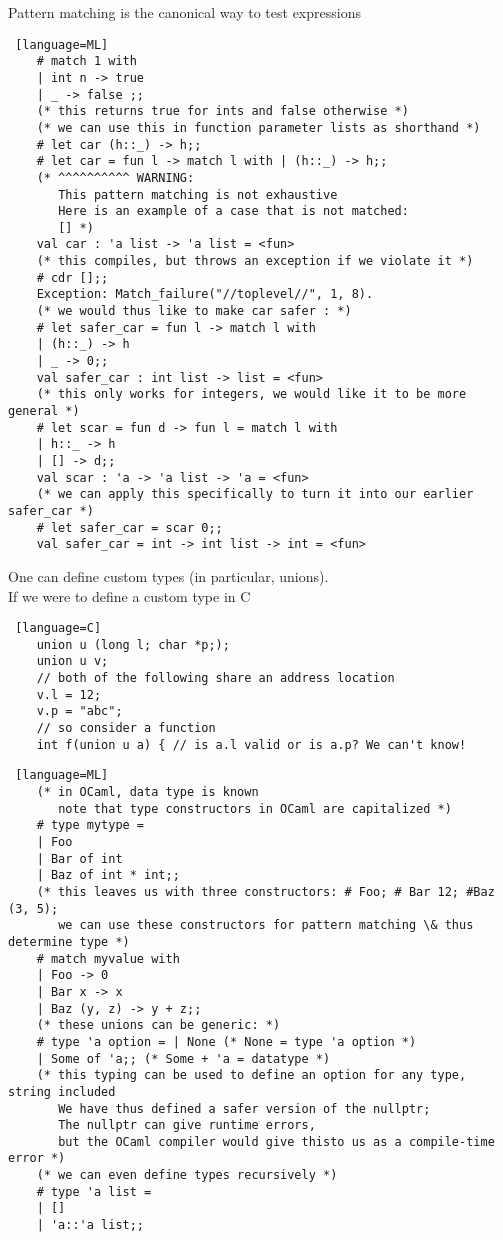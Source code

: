 \documentclass[../../lecture_notes.tex]{subfiles}
\begin{document}
\noindent Pattern matching is the canonical way to test expressions
\begin{lstlisting} [language=ML]
	# match 1 with
	| int n -> true
	| _ -> false ;;
	(* this returns true for ints and false otherwise *)
	(* we can use this in function parameter lists as shorthand *)
	# let car (h::_) -> h;;
	# let car = fun l -> match l with | (h::_) -> h;;
	(* ^^^^^^^^^^ WARNING: 
	   This pattern matching is not exhaustive
	   Here is an example of a case that is not matched:
	   [] *)
	val car : 'a list -> 'a list = <fun>
	(* this compiles, but throws an exception if we violate it *)
	# cdr [];;
	Exception: Match_failure("//toplevel//", 1, 8).
	(* we would thus like to make car safer : *)
	# let safer_car = fun l -> match l with 
	| (h::_) -> h
	| _ -> 0;;
	val safer_car : int list -> list = <fun>
	(* this only works for integers, we would like it to be more general *)
	# let scar = fun d -> fun l = match l with
	| h::_ -> h
	| [] -> d;;
	val scar : 'a -> 'a list -> 'a = <fun>
	(* we can apply this specifically to turn it into our earlier safer_car *)
	# let safer_car = scar 0;;
	val safer_car = int -> int list -> int = <fun>
\end{lstlisting} \medskip

\noindent One can define custom types (in particular, unions).\\
\indent If we were to define a custom type in C
\begin{lstlisting} [language=C]
	union u (long l; char *p;);
	union u v;
	// both of the following share an address location
	v.l = 12;
	v.p = "abc";
	// so consider a function
	int f(union u a) { // is a.l valid or is a.p? We can't know!
\end{lstlisting}
\begin{lstlisting} [language=ML]
	(* in OCaml, data type is known
 	   note that type constructors in OCaml are capitalized *)
	# type mytype =
	| Foo
	| Bar of int
	| Baz of int * int;;
	(* this leaves us with three constructors: # Foo; # Bar 12; #Baz (3, 5); 
	   we can use these constructors for pattern matching \& thus determine type *)
	# match myvalue with
	| Foo -> 0
	| Bar x -> x
	| Baz (y, z) -> y + z;;
	(* these unions can be generic: *)
	# type 'a option = | None (* None = type 'a option *)
	| Some of 'a;; (* Some + 'a = datatype *)
	(* this typing can be used to define an option for any type, string included 
	   We have thus defined a safer version of the nullptr;
	   The nullptr can give runtime errors, 
	   but the OCaml compiler would give thisto us as a compile-time error *)
	(* we can even define types recursively *)
	# type 'a list = 
	| []
	| 'a::'a list;;
\end{lstlisting}\medskip
\end{document}
